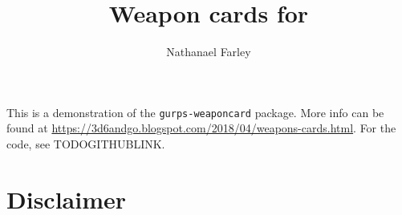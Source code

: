 \documentclass{article}
\title{Weapon cards for \gurps}
\author{Nathana\null el Farley}
\begin{document}
%

\maketitle

\noindent
This is a demonstration of the \texttt{gurps-weaponcard} package. More info can
be found at \url{https://3d6andgo.blogspot.com/2018/04/weapons-cards.html}. For
the code, see TODOGITHUBLINK.

\section*{Disclaimer}
\label{sec:disclaimer}


\vfill
\end{document}
